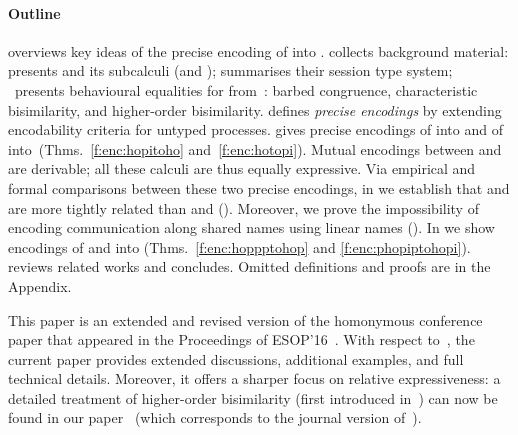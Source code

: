 \documentclass[preprint,11pt]{elsarticle}
\begin{document}
{\paragraph{Outline} 
 overviews key ideas of the precise encoding of \HOp into \sessp.
{} 
collects background material:
presents \HOp and its 
subcalculi (\HO and \sessp); %
 summarises their session type system;
~pres\-ents  behavioural equalities for \HOp from~\cite{characteristic_bis,KouzapasPY17}:
barbed congruence, characteristic bisimilarity, 
and higher-order bisimilarity.
 defines \emph{precise %
encodings} by extending encodability criteria  for untyped processes. %
{} %
gives {precise encodings} of \HOp into \HO and of \HOp into~\sessp (Thms.~\ref{f:enc:hopitoho} and~\ref{f:enc:hotopi}).
Mutual encodings between \sessp and \HO are derivable; 
all these calculi are thus equally expressive.
Via
empirical and formal comparisons between these two precise encodings, in  we establish that
\HOp and \HO are more tightly related than \HOp and \sessp ().
Moreover, we prove the impossibility of encoding communication along shared names
using linear names ().
In  %
we show 
encodings of \HOpp and \PHOp 
into \HOp
(Thms.~\ref{f:enc:hoppptohop} and \ref{f:enc:phopiptohopi}).
{} reviews related works and 
 concludes.
{Omitted definitions and  proofs are in the Appendix.
} 

This paper is an extended and revised version of the homonymous conference paper that appeared in the Proceedings of ESOP'16~\cite{DBLP:conf/esop/KouzapasPY16}.
With respect to~\cite{DBLP:conf/esop/KouzapasPY16}, the current paper 
provides extended discussions, additional examples, and full technical details. 
Moreover, it offers a sharper focus on relative expressiveness:
a detailed treatment of higher-order bisimilarity
(first introduced in~\cite{DBLP:conf/esop/KouzapasPY16}) can now be found in our paper~\cite{KouzapasPY17} (which corresponds to the journal version of~\cite{characteristic_bis}).

}
\end{document}
